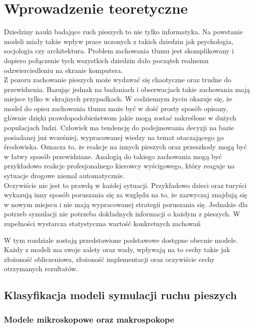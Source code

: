 \chapter{Wprowadzenie teoretyczne}
\label{cha:wprowadzenieTeoretyczne}

Dziedziny nauki badające ruch pieszych to nie tylko informatyka. Na powstanie modeli miały także wpływ prace uczonych z takich dziedzin jak psychologia, socjologia czy architektura. Problem zachowania tłumu jest skomplikowany i dopiero połączenie tych wszystkich dziedzin dało początek realnemu odzwierciedleniu na ekranie komputera. \\
Z pozoru zachowanie pieszych może wydawać się chaotyczne oraz trudne do przewidzenia. Bazując jednak na badaniach i obserwacjach takie zachowania mają miejsce tylko w skrajnych przypadkach. W codziennym życiu okazuje się, że model do opisu zachowania tłumu może być w dość prosty sposób opisany, głównie dzięki prawdopodobieństwom jakie mogą zostać nakreślone w dużych populacjach ludzi. Człowiek ma tendencję do podejmowania decyzji na bazie posiadanej już wcześniej, wypracowanej wiedzy na temat otaczającego go środowiska. Oznacza to, że reakcje na innych pieszych oraz przeszkody mogą być w łatwy sposób przewidziane. Analogią do takiego zachowania mogą być przykładowo reakcje profesjonalnego kierowcy wyścigowego, który reaguje na sytuacje drogowe niemal automatycznie. \\

Oczywiście nie jest to prawdą w każdej sytuacji. Przykładowo dzieci oraz turyści wykazują inny sposób poruszania się za względu na to, że zazwyczaj znajdują się w nowym miejscu i nie mają wypracowanej strategii poruszania się. Jednakże dla potrzeb symulacji nie potrzeba dokładnych informacji o każdym z pieszych. W zupełności wystarcza statystyczna wartość konkretnych zachowań

W tym rozdziale zostają przedstawione podstawowe dostępne obecnie modele. Każdy z modeli ma swoje zalety oraz wady, wpływają na to cechy takie jak złożoność obliczeniowa, złożoność implementacji oraz oczywiście cechy otrzymanych rezultatów.

\section{Klasyfikacja modeli symulacji ruchu pieszych}
\label{sec:klasyfikacja}

\subsection{Modele mikroskopowe oraz makrospokope}

